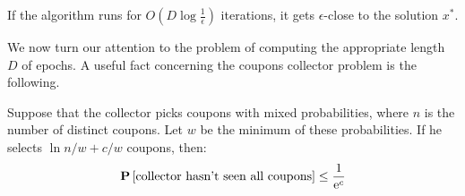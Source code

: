 \begin{corollary}
If the algorithm runs for $O(D \log \frac{1}{\epsilon})$ iterations, it gets $\epsilon$-close to the solution $x^*$.
\end{corollary}

We now turn our attention to the problem of computing the appropriate length $D$ of epochs. A useful fact concerning the coupons collector problem is the following.

\begin{lemma}
Suppose that the collector picks coupons with mixed probabilities, where $n$ is the number of distinct coupons.
Let $w$ be the minimum of these probabilities. If he selects $\ln n/w+ c/w$ coupons, then:
$$
\bm{\mathrm{P}}\left[\text{collector hasn't seen all coupons}\right] \leq \frac{1}{\mathrm{e}^c}
$$
\end{lemma}

